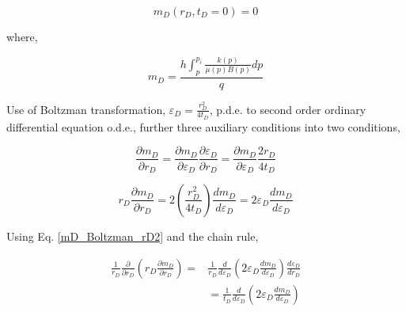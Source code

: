 \documentclass{llncs}
\numberwithin{equation}{section}
\numberwithin{figure}{section}
\numberwithin{table}{section}
\begin{document}
    \begin{equation}
        {{m}_{D}}\left( {{r}_{D}},{{t}_{D}}=0 \right)=0
        \label{Initial_Line_Source}
    \end{equation}

    where,

    \begin{equation}
        {{m}_{D}}=\frac{h\int_{p}^{{{p}_{i}}}{\frac{k\left( p \right)}{\mu \left( p \right)B\left( p \right)}dp}}{q}
        \label{mD_Line_Source}
    \end{equation}

    Use of Boltzman transformation, ${{\varepsilon }_{D}}=\frac{r_{D}^{2}}{4{{t}_{D}}}$,  p.d.e. to second order ordinary differential equation o.d.e., further  three auxiliary conditions into two conditions,

    \begin{equation}
        \frac{\partial {{m}_{D}}}{\partial {{r}_{D}}}=\frac{\partial {{m}_{D}}}{\partial {{\varepsilon }_{D}}}\frac{\partial {{\varepsilon }_{D}}}{\partial {{r}_{D}}}=\frac{\partial {{m}_{D}}}{\partial {{\varepsilon }_{D}}}\frac{2{{r}_{D}}}{4{{t}_{D}}}
        \label{mD_Boltzman_rD1}
    \end{equation}


    \begin{equation}
        {{r}_{D}}\frac{\partial {{m}_{D}}}{\partial {{r}_{D}}}=2\left( \frac{r_{D}^{2}}{4{{t}_{D}}} \right)\frac{d{{m}_{D}}}{d{{\varepsilon }_{D}}}=2{{\varepsilon }_{D}}\frac{d{{m}_{D}}}{d{{\varepsilon }_{D}}}
        \label{mD_Boltzman_rD2}
    \end{equation}

    Using Eq. \ref{mD_Boltzman_rD2} and the chain rule,

        \begin{equation}
        \begin{split}
         \frac{1}{{{r}_{D}}}\frac{\partial }{\partial {{r}_{D}}}\left( {{r}_{D}}\frac{\partial {{m}_{D}}}{\partial {{r}_{D}}} \right)=&\frac{1}{{{r}_{D}}}\frac{d}{d{{\varepsilon }_{D}}}\left( 2{{\varepsilon }_{D}}\frac{d{{m}_{D}}}{d{{\varepsilon }_{D}}} \right)\frac{d{{\varepsilon }_{D}}}{d{{r}_{D}}} \\
        & =\frac{1}{{{t}_{D}}}\frac{d}{d{{\varepsilon }_{D}}}\left( 2{{\varepsilon }_{D}}\frac{d{{m}_{D}}}{d{{\varepsilon }_{D}}} \right) \\
        \end{split}
        \label{mD_Boltzman_rD3}
    \end{equation}
\end{document}
